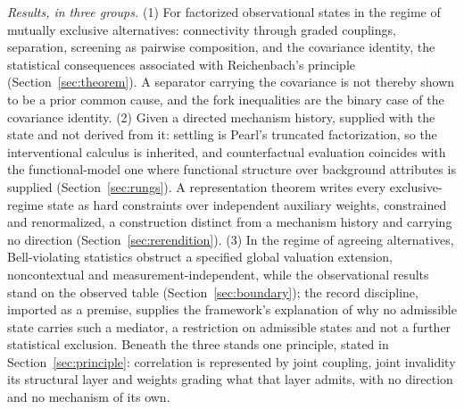 \documentclass[11pt]{article}
\begin{document}
\noindent\textit{Results, in three groups.} (1) For factorized observational states in the regime of mutually exclusive alternatives: connectivity through graded couplings, separation, screening as pairwise composition, and the covariance identity, the statistical consequences associated with Reichenbach's principle (Section~\ref{sec:theorem}). A separator carrying the covariance is not thereby shown to be a prior common cause, and the fork inequalities are the binary case of the covariance identity. (2) Given a directed mechanism history, supplied with the state and not derived from it: settling is Pearl's truncated factorization, so the interventional calculus is inherited, and counterfactual evaluation coincides with the functional-model one where functional structure over background attributes is supplied (Section~\ref{sec:rungs}). A representation theorem writes every exclusive-regime state as hard constraints over independent auxiliary weights, constrained and renormalized, a construction distinct from a mechanism history and carrying no direction (Section~\ref{sec:rerendition}). (3) In the regime of agreeing alternatives, Bell-violating statistics obstruct a specified global valuation extension, noncontextual and measurement-independent, while the observational results stand on the observed table (Section~\ref{sec:boundary}); the record discipline, imported as a premise, supplies the framework's explanation of why no admissible state carries such a mediator, a restriction on admissible states and not a further statistical exclusion. Beneath the three stands one principle, stated in Section~\ref{sec:principle}: correlation is represented by joint coupling, joint invalidity its structural layer and weights grading what that layer admits, with no direction and no mechanism of its own.
\end{document}
